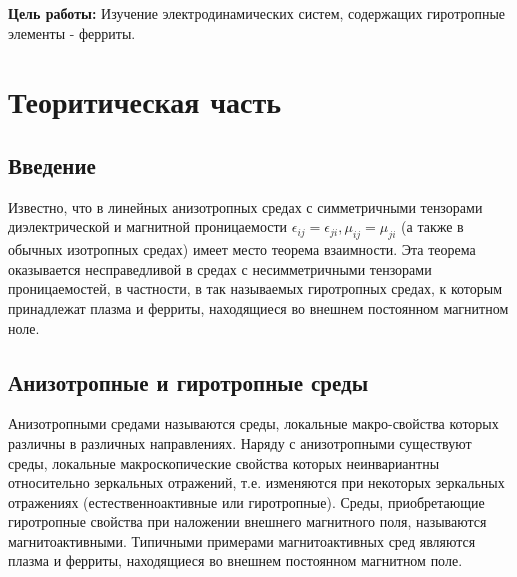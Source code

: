 
\newcommand{\vH}{\textbf{H}}
\newcommand{\vE}{\textbf{E}}
\newcommand{\vB}{\textbf{B}}
\newcommand{\vD}{\textbf{D}}
\newcommand{\vr}{\textbf{r}}
\newcommand{\vj}{\textbf{j}}
\newcommand{\vk}{\textbf{k}}
\newcommand{\vx}{\textbf{x}}
\newcommand{\vy}{\textbf{y}}
\newcommand{\vz}{\textbf{z}}


\def\labauthors{Карусевич А.А., Шиков А.П.}
\def\labgroup{440}
\def\labnumber{1}
\def\labtheme{Волноводные ферритовые устройства СВЧ диапазона}


\newpage

{\bfseries Цель работы:} 
Изучение электродинамических систем, содержащих гиротропные элементы - ферриты.

\section{Теоритическая часть}
\subsection{Введение}
Известно, что в линейных анизотропных средах с симметричными тензорами диэлектрической и магнитной проницаемости
$\epsilon_{ij} = \epsilon_{ji},\mu_{ij} = \mu_{ji}$ (а также в обычных изотропных средах) имеет место теорема взаимности. Эта теорема оказывается несправедливой в средах
с несимметричными тензорами проницаемостей, в частности, в так называемых гиротропных средах, к которым принадлежат
плазма и ферриты, находящиеся во внешнем постоянном магнитном ноле.


\subsection{Анизотропные и гиротропные среды}

Анизотропными средами называются среды, локальные макро-свойства которых различны в различных направлениях. 
Наряду с анизотропными существуют среды, локальные макроскопические свойства которых неинвариантны относительно
зеркальных отражений, т.е. изменяются при
некоторых зеркальных отражениях (естественноактивные или гиротропные). 
Среды, приобретающие гиротропные свойства при наложении внешнего магнитного поля, называются магнитоактивными. Типичными
примерами магнитоактивных сред являются плазма и ферриты, находящиеся во внешнем постоянном магнитном поле.

